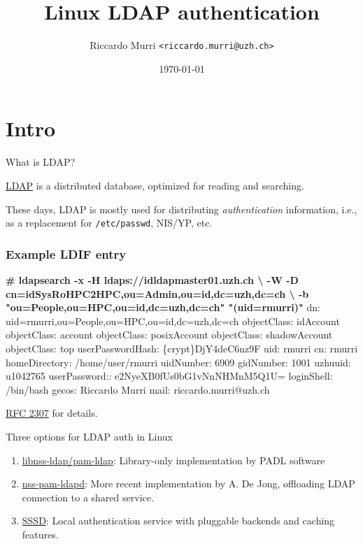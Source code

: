 \documentclass[english,serif,mathserif,usenames,dvipsnames]{beamer}
\begin{document}
\title[LDAP auth]{Linux LDAP authentication}
\author{Riccardo Murri \texttt{<riccardo.murri@uzh.ch>}}
\date{\today}

\maketitle

\section{Intro}
\begin{frame}{What is LDAP?}

  \href{http://en.wikipedia.org/wiki/Ldap}{LDAP} is a distributed
  database, optimized for reading and searching.

  \+ These days, LDAP is mostly used for distributing
  \emph{authentication} information, i.e., as a replacement for
  \texttt{/etc/passwd}, NIS/YP, etc.
\end{frame}


\begin{frame}[fragile]
  \frametitle{Example LDIF entry}
\begin{semiverbatim}\scriptsize
\textbf{# ldapsearch -x -H ldaps://idldapmaster01.uzh.ch {\textbackslash}
  -W -D cn=idSysRoHPC2HPC,ou=Admin,ou=id,dc=uzh,dc=ch {\textbackslash}
  -b "ou=People,ou=HPC,ou=id,dc=uzh,dc=ch" "(uid=rmurri)"}
dn: uid=rmurri,ou=People,ou=HPC,ou=id,dc=uzh,dc=ch
objectClass: idAccount
objectClass: account
objectClass: posixAccount
objectClass: shadowAccount
objectClass: top
userPasswordHash: \{crypt\}DjY4deC6nz9F
uid: rmurri
cn: rmurri
homeDirectory: /home/user/rmurri
uidNumber: 6909
gidNumber: 1001
uzhuuid: u1042765
userPassword:: e2NyeXB0fUs0bG1vNnNHMnM5Q1U=
loginShell: /bin/bash
gecos: Riccardo Murri
mail: riccardo.murri@uzh.ch
\end{semiverbatim}
  \begin{seealso}
    \href{https://www.ietf.org/rfc/rfc2307.txt}{RFC 2307} for details.
  \end{seealso}
\end{frame}


\begin{frame}{Three options for LDAP auth in Linux}
  \begin{enumerate}
  \item
    \href{http://www.padl.com/OSS/pam_ldap.html}{libnss-ldap/pam-ldap}:
    Library-only implementation by PADL software
  \item \href{http://arthurdejong.org/nss-pam-ldapd/}{nss-pam-ldapd}:
    More recent implementation by A. De Jong,
    offloading LDAP connection to a shared service.
  \item
    \href{https://access.redhat.com/documentation/en-US/Red_Hat_Enterprise_Linux/6/html/Deployment_Guide/SSSD-Introduction.html}{SSSD}:
    Local authentication service with pluggable backends and caching
    features.
  \end{enumerate}
\end{frame}
\end{document}
